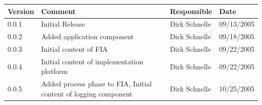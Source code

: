 \documentclass[11pt,a4paper]{article}
\begin{document}
\begin{tabular}{|l|p{5cm}|l|l|}
\hline
\textbf{Version} & \textbf{Comment} & \textbf{Responsible} & \textbf{Date} \\
\hline
\hline
0.0.1 & Initial Release & Dirk Schnelle & 09/13/2005 \\
\hline
0.0.2 & Added application component & Dirk Schnelle & 09/18/2005 \\
\hline
0.0.3 & Initial content of FIA & Dirk Schnelle & 09/22/2005 \\
\hline
0.0.4 & Initial content of implementation platform & Dirk Schnelle & 09/22/2005 \\
\hline
0.0.5 & Added process phase to FIA, Initial content of logging component & 
Dirk Schnelle & 10/25/2005 \\
\hline
\end{tabular}



\end{document}
